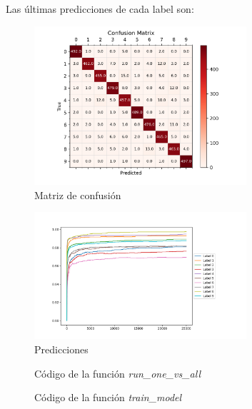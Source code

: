 \documentclass[6pt]{../../shared/AiTex}
\begin{document}
Las últimas predicciones de cada label son:


\begin{figure}[H]
    \centering
    \includegraphics[width=0.7\textwidth]{./imagenes/confusion_matrix_one_vs_all.png}
    \caption{Matriz de confusión}
    \label{fig:matrix_a}
\end{figure}

\begin{figure}[H]
    \centering
    \includegraphics[width=0.7\textwidth]{./imagenes/predictions_one_vs_all.png}
    \caption{Predicciones}
    \label{fig:predictions_a}
\end{figure}

\begin{figure}[H]
    \centering
    
    \caption{Código de la función \textit{run\_one\_vs\_all}}
    \label{fig:run_one_vs_all}
\end{figure}

\begin{figure}[H]
    \centering
    
    \caption{Código de la función \textit{train\_model}}
    \label{fig:train_model}
\end{figure}
\end{document}
